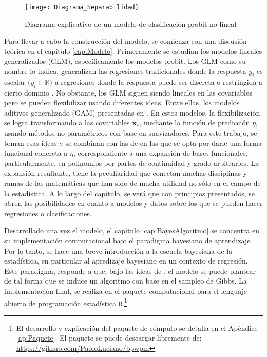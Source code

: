\documentclass[../Main/Main.tex]{subfiles}
\begin{document}
\begin{figure}[h]
  \centering
      \texttt{[image: Diagrama\_Separabilidad]}
  \caption{Diagrama explicativo de un modelo de clasificación probit no lineal}
  \label{fig:DiagramaIntro}
\end{figure}

Para llevar a cabo la construcción del modelo, se comienza con una discusión teórica en el capítulo \ref{cap:Modelo}. Primeramente se estudian los modelos lineales generalizados (GLM), específicamente los modelos probit. Los GLM como su nombre lo indica, generalizan las regresiones tradicionales donde la respuesta $y_i$ es escalar ($y_i \in \mathbb{R}$) a regresiones donde la respuesta puede ser discreta o restringida a cierto dominio \autocite{maccullagh1989generalized}. No obstante, los GLM siguen siendo lineales en las covariables pero se pueden flexibilizar usando diferentes ideas. Entre ellas, los modelos aditivos generalizado (GAM) presentadas en \citet{hastie1986generalized}. En estos modelos, la flexibilización se logra transformando a las covariables $\mathbf{x}_i$, mediante la función de predicción $\eta$, usando métodos no paramétricos con base en suavizadores. Para este trabajo, se toman esas ideas y se combinan con las de \citet{mallik1998automatic} en las que se opta por darle una forma funcional concreta a $\eta$, correspondiente a una expansión de bases funcionales, particularmente, en polinomios por partes de continuidad y grado arbitrarios. La expansión resultante, tiene la peculiaridad que conectan muchas disciplinas y ramas de las matemáticas que han sido de mucha utilidad no sólo en el campo de la estadística. A lo largo del capítulo, se verá que con principios presentados, se abren las posibilidades en cuanto a modelos y datos sobre los que se pueden hacer regresiones o clasificaciones. 

Desarrollado una vez el modelo, el capítulo \ref{cap:BayesAlgoritmo} se concentra en su implementación computacional bajo el paradigma bayesiano de aprendizaje. Por lo tanto, se hace una breve introducción a la escuela bayesiana de la estadística, en particular al apredizaje bayesiano en un contexto de regresión. Este paradigma, responde a que, bajo las ideas de \citet{albert1993bayesian}, el modelo se puede plantear de tal forma que se induce un algoritmo con base en el sampleo de Gibbs. La implementación final, se realiza en el paquete computacional para el lenguaje abierto de programación estadística \verb|R|.\footnote{El desarrollo y explicación del paquete de cómputo se detalla en el Apéndice \ref{ap:Paquete}. El paquete se puede descargar libremente de: \url{https://github.com/PaoloLuciano/bpwpm}}
\end{document}
